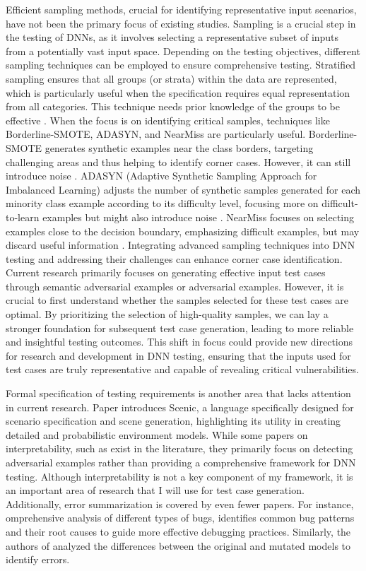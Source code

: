 Efficient sampling methods, crucial for identifying representative input scenarios, have not been the primary focus of existing studies. Sampling is a crucial step in the testing of DNNs, as it involves selecting a representative subset of inputs from a potentially vast input space. Depending on the testing objectives, different sampling techniques can be employed to ensure comprehensive testing. Stratified sampling ensures that all groups (or strata) within the data are represented, which is particularly useful when the specification requires equal representation from all categories. This technique needs prior knowledge of the groups to be effective \cite{Stratifiedsampling}. When the focus is on identifying critical samples, techniques like Borderline-SMOTE, ADASYN, and NearMiss are particularly useful. Borderline-SMOTE generates synthetic examples near the class borders, targeting challenging areas and thus helping to identify corner cases. However, it can still introduce noise \cite{Han2005}. ADASYN (Adaptive Synthetic Sampling Approach for Imbalanced Learning) adjusts the number of synthetic samples generated for each minority class example according to its difficulty level, focusing more on difficult-to-learn examples but might also introduce noise \cite{He2008}. NearMiss focuses on selecting examples close to the decision boundary, emphasizing difficult examples, but may discard useful information \cite{near-miss}. Integrating advanced sampling techniques into DNN testing and addressing their challenges can enhance corner case identification. Current research primarily focuses on generating effective input test cases through semantic adversarial examples or adversarial examples. However, it is crucial to first understand whether the samples selected for these test cases are optimal. By prioritizing the selection of high-quality samples, we can lay a stronger foundation for subsequent test case generation, leading to more reliable and insightful testing outcomes. This shift in focus could provide new directions for research and development in DNN testing, ensuring that the inputs used for test cases are truly representative and capable of revealing critical vulnerabilities.

Formal specification of testing requirements is another area that lacks attention in current research. Paper \cite{Scenic} introduces Scenic, a language specifically designed for scenario specification and scene generation, highlighting its utility in creating detailed and probabilistic environment models. While some papers on interpretability, such as \cite{Fidel, Lin, Walker, Rahnama, Watson, Kuppa} exist in the literature, they primarily focus on detecting adversarial examples rather than providing a comprehensive framework for DNN testing. Although interpretability is not a key component of my framework, it is an important area of research that I will use for test case generation. Additionally, error summarization is covered by even fewer papers. For instance, \cite{ChenJ} omprehensive analysis of different types of bugs, identifies common bug patterns and their root causes to guide more effective debugging practices. Similarly, the authors of \cite{Deepmutation} analyzed the differences between the original and mutated models to identify errors.

